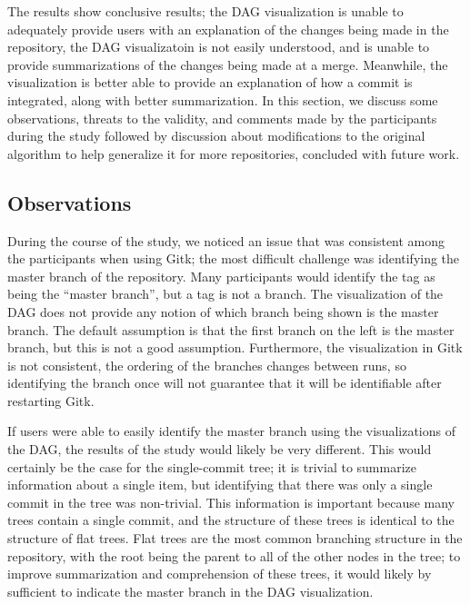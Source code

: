 

The results show conclusive results; the DAG visualization is unable to
adequately provide users with an explanation of the changes being made
in the repository, the DAG visualizatoin is not easily understood, and
is unable to provide summarizations of the changes being made at a
merge. Meanwhile, the \mt visualization is better able to provide an
explanation of how a commit is integrated, along with better
summarization. In this section, we discuss some observations, threats to
the validity, and comments made by the participants during the study
followed by discussion about modifications to the original algorithm to
help generalize it for more repositories, concluded with future work.


\subsection{Observations}
\label{sub:observations}



During the course of the study, we noticed an issue that was consistent
among the participants when using Gitk; the most difficult challenge was
identifying the master branch of the repository. Many participants would
identify the tag as being the ``master branch'', but a tag is not a
branch. The visualization of the DAG does not provide any notion of
which branch being shown is the master branch. The default assumption is
that the first branch on the left is the master branch, but this is not
a good assumption. Furthermore, the visualization in Gitk is not
consistent, the ordering of the branches changes between runs, so
identifying the branch once will not guarantee that it will be
identifiable after restarting Gitk.

If users were able to easily identify the master branch using the
visualizations of the DAG, the results of the study would likely be very
different. This would certainly be the case for the single-commit tree;
it is trivial to summarize information about a single item, but
identifying that there was only a single commit in the tree was
non-trivial. This information is important because many trees contain a
single commit, and the structure of these trees is identical to the
structure of flat trees. Flat trees are the most common branching
structure in the repository, with the root being the parent to all of
the other nodes in the tree; to improve summarization and comprehension
of these trees, it would likely by sufficient to indicate the master
branch in the DAG visualization.

